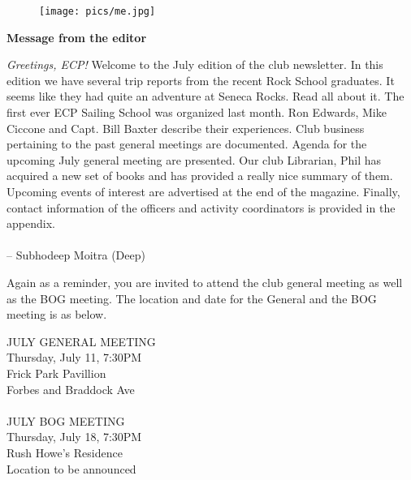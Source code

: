 \documentclass[10pt,a4paper]{article}
\newcommand{\NewsItem}[1]{%
		\usefont{T1}{augie}{m}{n} 	
		\large \bf #1 \vspace{4pt}
		\par \normalsize \normalfont}
\begin{document}
\begin{center}
\begin{minipage}[h]{0.8\linewidth}
	\begin{wrapfigure}{l}{0.41\textwidth}
		\texttt{[image: pics/me.jpg]}
		\\%
	\end{wrapfigure}
	
	\NewsItem{Message from the editor}

	\emph{Greetings, ECP!} Welcome to the July edition of the club newsletter. In this edition we have several trip reports from the recent Rock School graduates. It seems like they had quite an adventure at Seneca Rocks. Read all about it. The first ever ECP Sailing School was organized last month. Ron Edwards, Mike Ciccone and Capt. Bill Baxter describe their experiences. Club business pertaining to the past general meetings are documented. Agenda for the upcoming July general meeting are presented. Our club Librarian, Phil has acquired a new set of books and has provided a really nice summary of them. Upcoming events of interest are advertised at the end of the magazine. Finally, contact information of the officers and activity coordinators is provided in the appendix. 
\\
\\
-- Subhodeep Moitra (Deep)

\vspace{0.5cm}



	Again as a reminder, you are invited to attend the club general meeting as well as the BOG meeting. The location and date for the General and the BOG meeting is as below.
	
\vspace{1cm}

\begin{multicols}{2}
\Large


JULY GENERAL MEETING\\
Thursday, July 11, 7:30PM\\
Frick Park Pavillion\\
Forbes and Braddock Ave\\
\\
JULY BOG MEETING\\
Thursday, July 18, 7:30PM\\
Rush Howe's Residence \\ 
Location to be announced

\normalsize
\end{multicols}
	
\end{minipage}
\end{center}
\end{document}
